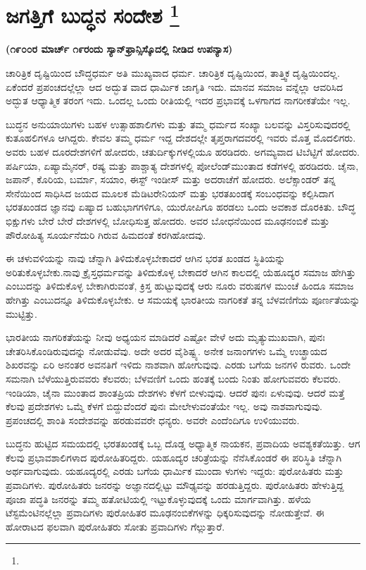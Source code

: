 
\chapter[ಜಗತ್ತಿಗೆ ಬುದ್ಧನ ಸಂದೇಶ ]{ಜಗತ್ತಿಗೆ ಬುದ್ಧನ ಸಂದೇಶ \protect\footnote{}}

\centerline{\textbf{(೧೯೦೦ರ ಮಾರ್ಚ್​ ೧೯ರಂದು ಸ್ಯಾನ್​ಫ್ರಾನ್ಸಿಸ್ಕೊದಲ್ಲಿ ನೀಡಿದ ಉಪನ್ಯಾಸ)}}

ಚಾರಿತ್ರಿಕ ದೃಷ್ಟಿಯಿಂದ ಬೌದ್ಧಧರ್ಮ ಅತಿ ಮುಖ್ಯವಾದ ಧರ್ಮ. ಚಾರಿತ್ರಿಕ ದೃಷ್ಟಿಯಿಂದ, ತಾತ್ತ್ವಿಕ ದೃಷ್ಟಿಯಿಂದಲ್ಲ. ಏಕೆಂದರೆ ಪ್ರಪಂಚದಲ್ಲೆಲ್ಲಾ ಆದ ಅದ್ಭುತ ವಾದ ಧಾರ್ಮಿಕ ಜಾಗೃತಿ ಇದು. ಮಾನವ ಸಮಾಜ ವನ್ನೆಲ್ಲಾ ಆವರಿಸಿದ ಅದ್ಭುತ ಆಧ್ಯಾತ್ಮಿಕ ತರಂಗ ಇದು. ಒಂದಲ್ಲ ಒಂದು ರೀತಿಯಲ್ಲಿ ಇದರ ಪ್ರಭಾವಕ್ಕೆ ಒಳಗಾಗದ ನಾಗರೀಕತೆಯೇ ಇಲ್ಲ.

ಬುದ್ಧನ ಅನುಯಾಯಿಗಳು ಬಹಳ ಉತ್ಸಾಹಶಾಲಿಗಳು ಮತ್ತು ತಮ್ಮ ಧರ್ಮದ ಸಂಖ್ಯಾ ಬಲವನ್ನು ವಿಸ್ತರಿಸುವುದರಲ್ಲಿ ಕುತೂಹಲಿಗಳೂ ಆಗಿದ್ದರು. ಕೇವಲ ತಮ್ಮ ಧರ್ಮ ಇದ್ದ ದೇಶದಲ್ಲೇ ತೃಪ್ತರಾಗದವರಲ್ಲಿ ಇವರು ಮೊತ್ತ ಮೊದಲಿಗರು. ಅವರು ಬಹಳ ದೂರದೇಶಗಳಿಗೆ ಹೋದರು, ಚತುರ್ದಿಕ್ಕುಗಳಲ್ಲಿಯೂ ಹರಡಿದರು. ಅಗಮ್ಯವಾದ ಟಿಬೆಟ್ಟಿಗೆ ಹೋದರು. ಪರ್ಷಿಯಾ, ಏಷ್ಯಾಮೈನರ್​, ರಷ್ಯ ಮತ್ತು ಪಾಶ್ಚಾತ್ಯ ದೇಶಗಳಲ್ಲಿ ಪೋಲೆಂಡ್​ ಮುಂತಾದ ಕಡೆಗಳಲ್ಲಿ ಹರಡಿದರು. ಚೈನಾ, ಜಪಾನ್​, ಕೊರಿಯ, ಬರ್ಮಾ, ಸಯಾಂ, ಈಸ್ಟ್​ ಇಂಡೀಸ್​ ಮತ್ತು ಅದರಾಚೆಗೆ ಹೋದರು. ಅಲೆಕ್ಸಾಂಡರ್​ ತನ್ನ ಸೇನೆಯಿಂದ ಸಾಧಿಸಿದ ಜಯದ ಮೂಲಕ ಮೆಡಿಟರೇನಿಯನ್​ ಮತ್ತು ಭರತಖಂಡಕ್ಕೆ ಸಂಬಂಧವನ್ನು ಕಲ್ಪಿಸಿದಾಗ ಭರತಖಂಡದ ಜ್ಞಾನವು ಏಷ್ಯಾದ ಬಹುಭಾಗಗಳಿಗೂ, ಯುರೋಪಿಗೂ ಹರಡಲು ಒಂದು ಅವಕಾಶ ದೊರಕಿತು. ಬೌದ್ಧ ಭಿಕ್ಷುಗಳು ಬೇರೆ ಬೇರೆ ದೇಶಗಳಲ್ಲಿ ಬೋಧಿಸುತ್ತ ಹೋದರು. ಅವರ ಬೋಧನೆಯಿಂದ ಮೂಢನಂಬಿಕೆ ಮತ್ತು ಪೌರೋಹಿತ್ಯ ಸೂರ್ಯನೆದುರಿ ಗಿರುವ ಹಿಮದಂತೆ ಕರಗಿಹೋದವು.

ಈ ಚಳುವಳಿಯನ್ನು ನಾವು ಚೆನ್ನಾಗಿ ತಿಳಿದುಕೊಳ್ಳಬೇಕಾದರೆ ಆಗಿನ ಭರತ ಖಂಡದ ಸ್ಥಿತಿಯನ್ನು ಅರಿತುಕೊಳ್ಳಬೇಕು.ನಾವು ಕ್ರೈಸ್ತಧರ್ಮವನ್ನು ತಿಳಿದುಕೊಳ್ಳ ಬೇಕಾದರೆ ಆಗಿನ ಕಾಲದಲ್ಲಿ ಯೆಹೂದ್ಯರ ಸಮಾಜ ಹೇಗಿತ್ತು ಎಂಬುದನ್ನು ತಿಳಿದುಕೊಳ್ಳ ಬೇಕಾಗಿರುವಂತೆ, ಕ್ರಿಸ್ತ ಹುಟ್ಟುವುದಕ್ಕೆ ಆರು ನೂರು ವರುಷಗಳ ಮುಂಚೆ ಹಿಂದೂ ಸಮಾಜ ಹೇಗಿತ್ತು ಎಂಬುದನ್ನೂ ತಿಳಿದುಕೊಳ್ಳಬೇಕು. ಆ ಸಮಯಕ್ಕೆ ಭಾರತೀಯ ನಾಗರಿಕತೆ ತನ್ನ ಬೆಳವಣಿಗೆಯ ಪೂರ್ಣತೆಯನ್ನು ಮುಟ್ಟಿತ್ತು.

ಭಾರತೀಯ ನಾಗರಿಕತೆಯನ್ನು ನೀವು ಅಧ್ಯಯನ ಮಾಡಿದರೆ ಎಷ್ಟೋ ವೇಳೆ ಅದು ಮೃತ್ಯುಮುಖವಾಗಿ, ಪುನಃ ಚೇತರಿಸಿಕೊಂಡಿರುವುದನ್ನು ನೋಡುವೆವು. ಅದೇ ಅದರ ವೈಶಿಷ್ಟ್ಯ. ಅನೇಕ ಜನಾಂಗಗಳು ಒಮ್ಮೆ ಉಚ್ಛ್ರಾಯದ ಶಿಖರವನ್ನು ಏರಿ ಅನಂತರ ಅವನತಿಗೆ ಇಳಿದು ನಾಶವಾಗಿ ಹೋಗುವುವು. ಎರಡು ಬಗೆಯ ಜನಗಳಿ ರುವರು. ಒಂದೇ ಸಮನಾಗಿ ಬೆಳೆಯುತ್ತಿರುವವರು ಕೆಲವರು; ಬೆಳವಣಿಗೆ ಒಂದು ಹಂತಕ್ಕೆ ಬಂದು ನಿಂತು ಹೋಗುವವರು ಕೆಲವರು. ಇಂಡಿಯಾ, ಚೈನಾ ಮುಂತಾದ ಶಾಂತಪ್ರಿಯ ದೇಶಗಳು ಕೆಳಗೆ ಬೀಳುವುವು. ಆದರೆ ಪುನಃ ಏಳುವುವು. ಆದರೆ ಮತ್ತೆ ಕೆಲವು ಪ್ರದೇಶಗಳು ಒಮ್ಮೆ ಕೆಳಗೆ ಬಿದ್ದುವೆಂದರೆ ಪುನಃ ಮೇಲೇಳುವಂತೆಯೇ ಇಲ್ಲ. ಅವು ನಾಶವಾಗುವುವು. ಪ್ರಪಂಚದಲ್ಲಿ ಶಾಂತಿ ಸಂದೇಶವನ್ನು ಹರಡುವವರೇ ಧನ್ಯರು. ಅವರೇ ಎಂದೆಂದಿಗೂ ಉಳಿಯುವರು.

ಬುದ್ಧನು ಹುಟ್ಟಿದ ಸಮಯದಲ್ಲಿ ಭರತಖಂಡಕ್ಕೆ ಒಬ್ಬ ದೊಡ್ಡ ಅಧ್ಯಾತ್ಮಿಕ ನಾಯಕನ, ಪ್ರವಾದಿಯ ಅವಶ್ಯಕತೆಯಿತ್ತು. ಆಗ ಕೆಲವು ಪ್ರಭಾವಶಾಲಿಗಳಾದ ಪುರೋಹಿತರಿದ್ದರು. ಯಹೂದ್ಯರ ಚರಿತ್ರೆಯನ್ನು ನೆನೆಸಿಕೊಂಡರೆ ಈ ಪರಿಸ್ಥಿತಿ ಚೆನ್ನಾಗಿ ಅರ್ಥವಾಗುವುದು. ಯಹೂದ್ಯರಲ್ಲಿ ಎರಡು ಬಗೆಯ ಧಾರ್ಮಿಕ ಮುಂದಾ ಳುಗಳು ಇದ್ದರು: ಪುರೋಹಿತರು ಮತ್ತು ಪ್ರವಾದಿಗಳು. ಪುರೋಹಿತರು ಜನರನ್ನು ಅಜ್ಞಾನದಲ್ಲಿಟ್ಟು ಮೌಢ್ಯವನ್ನು ಹರಡುತ್ತಿದ್ದರು. ಪುರೋಹಿತರು ಹೇಳುತ್ತಿದ್ದ ಪೂಜಾ ಪದ್ಧತಿ ಜನರನ್ನು ತಮ್ಮ ಹತೋಟಿಯಲ್ಲಿ ಇಟ್ಟುಕೊಳ್ಳುವುದಕ್ಕೆ ಒಂದು ಮಾರ್ಗವಾಗಿತ್ತು. ಹಳೆಯ ಟೆಸ್ಟಮೆಂಟಿನಲ್ಲೆಲ್ಲಾ ಪ್ರವಾದಿಗಳು ಪುರೋಹಿತರ ಮೂಢನಂಬಿಕೆಗಳನ್ನು ಧಿಕ್ಕರಿಸುವುದನ್ನು ನೋಡು\-ತ್ತೇವೆ. ಈ ಹೋರಾಟದ ಫಲವಾಗಿ ಪುರೋಹಿತರು ಸೋತು ಪ್ರವಾದಿಗಳು ಗೆಲ್ಲುತ್ತಾರೆ.

